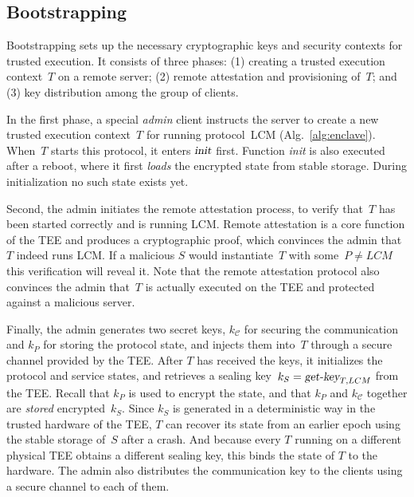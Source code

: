 \documentclass[11pt]{article}
\theoremstyle{plain-boldhead}
\theoremstyle{definition-boldhead}
\newcommand{\op}[1]{\textsl{#1}}
\newcommand{\CC}{\ensuremath{\mathcal{C}}\xspace}
\newcommand{\pp}{LCM\xspace}
\begin{document}
\subsection{Bootstrapping}

Bootstrapping sets up the necessary cryptographic keys and security
contexts for trusted execution.  It consists of three phases:
(1) creating a trusted execution context~$T$ on a remote server; (2) remote
attestation and provisioning of~$T$; and (3) key distribution among the
group of clients.

In the first phase, a special \emph{admin} client instructs the server to
create a new trusted execution context~$T$ for running protocol~\pp
(Alg.~\ref{alg:enclave}). When~$T$ starts this protocol, it enters 
$\op{init}$ first.
% 
Function \op{init} is also executed after a reboot, where it first
\op{loads} the encrypted state from stable storage.  During initialization
no such state exists yet.

Second, the admin initiates the remote attestation process, to verify
that~$T$ has been started correctly and is running \pp.  Remote attestation
is a core function of the TEE and produces a cryptographic proof, which
convinces the admin that $T$ indeed runs \pp.  If a malicious $S$ would
instantiate~$T$ with some~$P \neq \pp$ this verification will reveal it.
%
Note that the remote attestation protocol also convinces the admin that~$T$
is actually executed on the TEE and protected against a malicious server.

Finally, the admin generates two secret keys, $k_{\CC}$ for securing the
communication and $k_{P}$ for storing the protocol state, and injects them
into~$T$ through a secure channel provided by the TEE.
After $T$ has received the keys, it initializes the protocol and service
states, and retrieves a sealing key~$k_S = \op{get-key}_{T,\pp}$ from the
TEE.  Recall that $k_P$ is used to encrypt the state, and that $k_P$ and
$k_{\CC}$ together are \op{stored} encrypted~$k_S$.  Since $k_S$ is
generated in a deterministic way in the trusted hardware of the TEE, $T$
can recover its state from an earlier epoch using the stable storage of~$S$
after a crash.  And because every $T$ running on a different physical TEE
obtains a different sealing key, this binds the state of $T$ to the
hardware.
%
The admin also distributes the communication key to the
clients using a secure channel to each of them.
\end{document}

